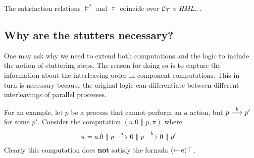 \begin{remark}
    The satisfaction relations $\vDash^*$ and $\vDash$ coincide over $\mathcal{C}_{\mathcal{T}} \times \textit{HML}_\shortleftarrow$.
\end{remark}


\subsection{Why are the stutters necessary?}

One may ask why we need to extend both computations and the logic to include the
notion of stuttering steps. The reason for doing so is to capture the information
about the interleaving order in component computations. This in turn is necessary because
the original logic can differentiate between different interleavings of parallel
processes.

For an example, let $p$ be a process that cannot perform an $a$ action, but
$p\ {\stackrel{{b}}{\longrightarrow}}\  p'$ for some $p'$. Consider the computation $(a.0 \parallel p, \pi)$
where
\begin{equation}\label{eq:interleave1}
    \pi = a.0 \parallel p \ {\stackrel{{a}}{\longrightarrow}}\  0 \parallel p \ {\stackrel{{b}}{\longrightarrow}}\  0 \parallel p'
\end{equation}
Clearly this computation does {\bf not} satisfy the formula $\mbox{\ensuremath{\langle\leftarrow\! a \rangle}}\top$.

